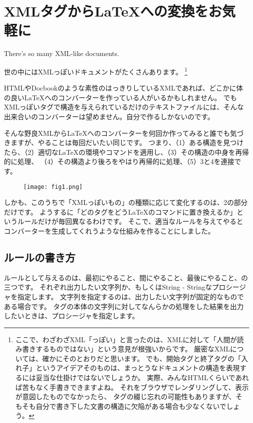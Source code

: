 \documentclass{jsbook}
\begin{document}
\chapter{XMLタグからLaTeXへの変換をお気軽に}{\small
There's so many XML-like documents.
}


世の中にはXMLっぽいドキュメントがたくさんあります。
\footnote{
ここで、わざわざXML「っぽい」と言ったのは、XMLに対して「人間が読み書きするものではない」という意見が根強いからです。
厳密なXMLについては、確かにそのとおりだと思います。
でも、開始タグと終了タグの「入れ子」というアイデアそのものは、まっとうなドキュメントの構造を表現するには妥当な仕掛けではないでしょうか。
実際、みんなHTMLくらいであれば苦もなく手書きできますよね。
それをブラウザでレンダリングして、表示が意図したものでなかったら、
タグの綴じ忘れの可能性もありますが、そもそも自分で書き下した文書の構造に欠陥がある場合も少なくないでしょう。
}


HTMLやDocbookのような素性のはっきりしているXMLであれば、どこかに体の良いLaTeXへのコンバーターを作っている人がいるかもしれません。
でもXMLっぽいタグで構造を与えられているだけのテキストファイルには、そんな出来合いのコンバーターは望めません。自分で作るしかないのです。



そんな野良XMLからLaTeXへのコンバーターを何回か作ってみると誰でも気づきますが、やることは毎回だいたい同じです。
つまり、（1）ある構造を見つけたら、（2）適切なLaTeXの環境やコマンドを適用し、（3）その構造の中身を再帰的に処理、
（4）その構造より後ろをやはり再帰的に処理、（5）3と4を連接です。


\begin{figure}
\texttt{[image: fig1.png]}\end{figure}
しかも、このうちで「XMLっぽいもの」の種類に応じて変化するのは、2の部分だけです。
ようするに「どのタグをどうLaTeXのコマンドに置き換えるか」というルールだけが毎回異なるわけです。
そこで、適当なルールを与えてやるとコンバーターを生成してくれうような仕組みを作ることにしました。


\section{ルールの書き方}
ルールとして与えるのは、最初にやること、間にやること、最後にやること、の三つです。
それぞれ出力したい文字列か、もしくはString -{} Stringなプロシージャを指定します。
文字列を指定するのは、出力したい文字列が固定的なものである場合です。
タグの本体の文字列に対してなんらかの処理をした結果を出力したいときは、プロシージャを指定します。
\end{document}
